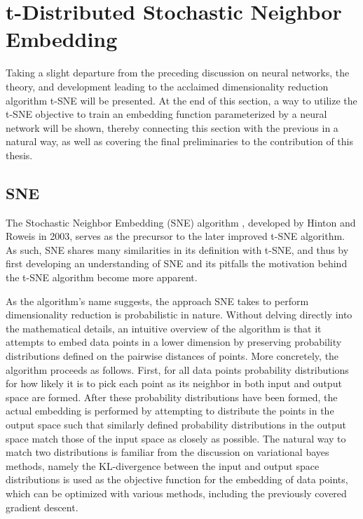 \section{t-Distributed Stochastic Neighbor Embedding}
\label{section:tsne}

Taking a slight departure from the preceding discussion on neural networks, the theory, and development leading to the acclaimed dimensionality reduction algorithm t-SNE will be presented. At the end of this section, a way to utilize the t-SNE objective to train an embedding function parameterized by a neural network will be shown, thereby connecting this section with the previous in a natural way, as well as covering the final preliminaries to the contribution of this thesis.

\subsection{SNE}
\label{subsection:sne}

The Stochastic Neighbor Embedding (SNE) algorithm \cite{sne}, developed by Hinton and Roweis in 2003, serves as the precursor to the later improved t-SNE algorithm. As such, SNE shares many similarities in its definition with t-SNE, and thus by first developing an understanding of SNE and its pitfalls the motivation behind the t-SNE algorithm become more apparent.

As the algorithm's name suggests, the approach SNE takes to perform dimensionality reduction is probabilistic in nature. Without delving directly into the mathematical details, an intuitive overview of the algorithm is that it attempts to embed data points in a lower dimension by preserving probability distributions defined on the pairwise distances of points. More concretely, the algorithm proceeds as follows. First, for all data points probability distributions for how likely it is to pick each point as its neighbor in both input and output space are formed. After these probability distributions have been formed, the actual embedding is performed by attempting to distribute the points in the output space such that similarly defined probability distributions in the output space match those of the input space as closely as possible. The natural way to match two distributions is familiar from the discussion on variational bayes methods, namely the KL-divergence between the input and output space distributions is used as the objective function for the embedding of data points, which can be optimized with various methods, including the previously covered gradient descent.

